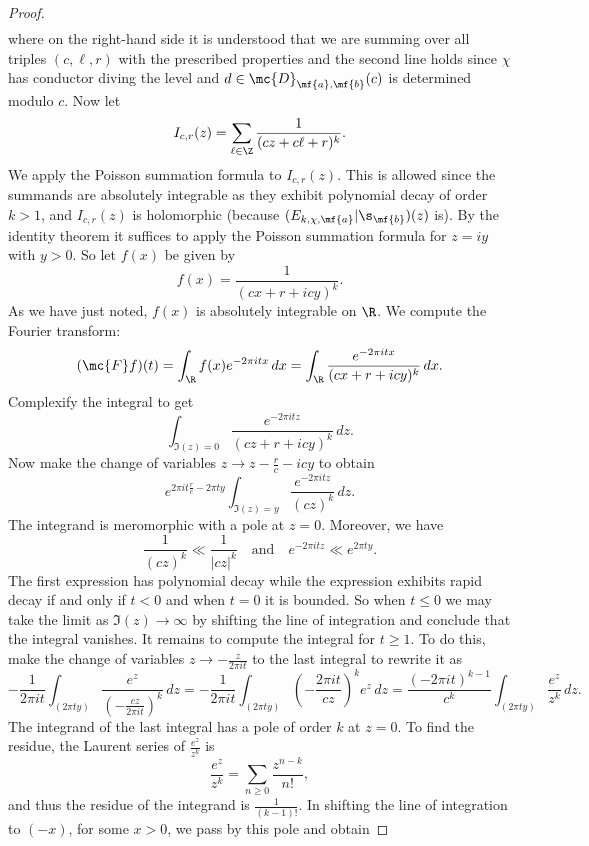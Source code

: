 \begin{proof}
\begin{align*}
      \end{align*}
      where on the right-hand side it is understood that we are summing over all triples $(c,\ell,r)$ with the prescribed properties and the second line holds since $\chi$ has conductor diving the level and $d \in \mc{D}_{\mf{a},\mf{b}}(c)$ is determined modulo $c$. Now let
      \[
        I_{c,r}(z) = \sum_{\ell \in \Z}\frac{1}{(cz+c\ell+r)^{k}}.
      \]
      We apply the Poisson summation formula to $I_{c,r}(z)$. This is allowed since the summands are absolutely integrable as they exhibit polynomial decay of order $k > 1$, and $I_{c,r}(z)$ is holomorphic (because $(E_{k,\chi,\mf{a}}|\s_{\mf{b}})(z)$ is). By the identity theorem it suffices to apply the Poisson summation formula for $z = iy$ with $y > 0$. So let $f(x)$ be given by
      \[
        f(x) = \frac{1}{(cx+r+icy)^{k}}.
      \]
      As we have just noted, $f(x)$ is absolutely integrable on $\R$. We compute the Fourier transform:
      \[
        (\mc{F}f)(t) = \int_{\R}f(x)e^{-2\pi itx}\,dx = \int_{\R}\frac{e^{-2\pi itx}}{(cx+r+icy)^{k}}\,dx.
      \]
      Complexify the integral to get
      \[
        \int_{\Im(z) = 0}\frac{e^{-2\pi itz}}{(cz+r+icy)^{k}}\,dz.
      \]
      Now make the change of variables $z \to z-\frac{r}{c}-icy$ to obtain
      \[
        e^{2\pi it\frac{r}{c}-2\pi ty}\int_{\Im(z) = y}\frac{e^{-2\pi itz}}{(cz)^{k}}\,dz.
      \]
      The integrand is meromorphic with a pole at $z = 0$. Moreover, we have
      \[
        \frac{1}{(cz)^{k}} \ll \frac{1}{|cz|^{k}} \quad \text{and} \quad e^{-2\pi itz} \ll e^{2\pi ty}.
      \]
      The first expression has polynomial decay while the expression exhibits rapid decay if and only if $t < 0$ and when $t = 0$ it is bounded. So when $t \le 0$ we may take the limit as $\Im(z) \to \infty$ by shifting the line of integration and conclude that the integral vanishes. It remains to compute the integral for $t \ge 1$. To do this, make the change of variables $z \to -\frac{z}{2\pi it}$ to the last integral to rewrite it as
      \[
        -\frac{1}{2\pi it}\int_{(2\pi ty)}\frac{e^{z}}{\left(-\frac{cz}{2\pi it}\right)^{k}}\,dz = -\frac{1}{2\pi it}\int_{(2\pi ty)}\left(-\frac{2\pi it}{cz}\right)^{k}e^{z}\,dz = \frac{(-2\pi it)^{k-1}}{c^{k}}\int_{(2\pi ty)}\frac{e^{z}}{z^{k}}\,dz.
      \]
      The integrand of the last integral has a pole of order $k$ at $z = 0$. To find the residue, the Laurent series of $\frac{e^{z}}{z^{k}}$ is
      \[
        \frac{e^{z}}{z^{k}} = \sum_{n \ge 0}\frac{z^{n-k}}{n!},
      \]
      and thus the residue of the integrand is $\frac{1}{(k-1)!}$. In shifting the line of integration to $(-x)$, for some $x > 0$, we pass by this pole and obtain

\end{proof}
